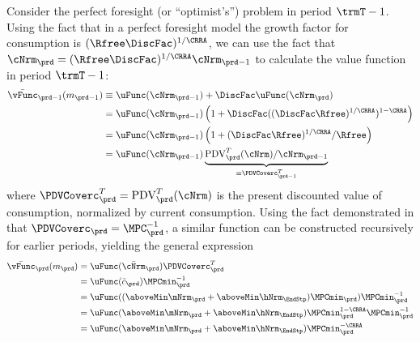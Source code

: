   Consider the perfect foresight (or ``optimist's'') problem in period $\trmT-1$.  Using the fact that in a perfect foresight model the growth factor for consumption is $(\Rfree \DiscFac)^{1/\CRRA}$, we can use the fact that $\cNrm_{\prd} = (\Rfree \DiscFac)^{1/\CRRA} \cNrm_{\prd-1}$ to calculate the value function in period $\trmT-1$:
  \begin{equation*}\begin{gathered}\begin{aligned}
        \bar{\vFunc}_{\prd-1}({m}_{\prd-1})  & \equiv  \uFunc(\cNrm_{\prd-1})+\DiscFac \uFunc(\cNrm_{\prd})
        \\  & = \uFunc(\cNrm_{\prd-1})\left(1+\DiscFac ((\DiscFac\Rfree)^{1/\CRRA})^{1-\CRRA}\right)
        \\  & = \uFunc(\cNrm_{\prd-1})\left(1+(\DiscFac\Rfree)^{1/\CRRA}/\Rfree\right)
        \\  & = \uFunc(\cNrm_{\prd-1})\underbrace{\mbox{PDV}_{\prd}^{T}(\cNrm)/\cNrm_{\prd-1}}_{\equiv \PDVCoverc_{\prd-1}^{T}}
      \end{aligned}\end{gathered}\end{equation*}
  where $\PDVCoverc_{\prd}^{T}=\mbox{PDV}_{\prd}^{T}(\cNrm)$ is the present discounted value of consumption, normalized by current consumption. Using the fact demonstrated in \cite{BufferStockTheory} that $\PDVCoverc_{\prd}=\MPC^{-1}_{\prd}$, a similar function can be constructed recursively for earlier periods, yielding the general expression \hypertarget{vFuncPF}{}
  \begin{equation}\begin{gathered}\begin{aligned}
        \bar{\vFunc}_{\prd}({m}_{\prd})  & = \uFunc(\bar{\cNrm}_{\prd})\PDVCoverc_{\prd}^{T}\label{eq:vFuncPF}
        \\  & = \uFunc(\bar{c}_{\prd}) \MPCmin_{\prd}^{-1} %
        \\  & = \uFunc((\aboveMin \mNrm_{\prd}+\aboveMin \hNrm_{\EndStp})\MPCmin_{\prd}) \MPCmin_{\prd}^{-1} %
        \\  & = \uFunc(\aboveMin \mNrm_{\prd}+\aboveMin \hNrm_{\EndStp})\MPCmin_{\prd}^{1-\CRRA} \MPCmin_{\prd}^{-1} %
        \\  & = \uFunc(\aboveMin \mNrm_{\prd}+\aboveMin \hNrm_{\EndStp})\MPCmin_{\prd}^{-\CRRA}  %
      \end{aligned}\end{gathered}\end{equation}

